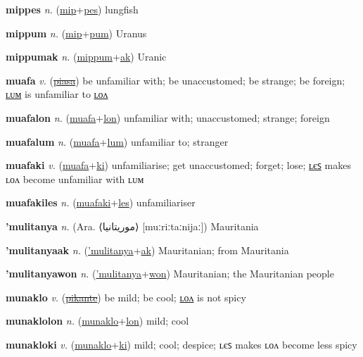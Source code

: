 \textbf{\hypertarget{mippes}{mippes}} \textit{n.} (\hyperlink{mip}{mip}+\allowbreak \hyperlink{pes}{pes})
lungfish

\textbf{\hypertarget{mippum}{mippum}} \textit{n.} (\hyperlink{mip}{mip}+\allowbreak \hyperlink{pum}{pum})
Uranus

\textbf{\hypertarget{mippumak}{mippumak}} \textit{n.} (\hyperlink{mippum}{mippum}+\allowbreak \hyperlink{ak}{ak})
Uranic

\textbf{\hypertarget{muafa}{muafa}} \textit{v.} (\hyperlink{piasa}{\sout{piasa}})
be unfamiliar with; be unaccustomed; be strange; be foreign; \hyperlink{muafalum}{ʟᴜᴍ} is unfamiliar to \hyperlink{muafalon}{ʟᴏᴧ}

\textbf{\hypertarget{muafalon}{muafalon}} \textit{n.} (\hyperlink{muafa}{muafa}+\allowbreak \hyperlink{lon}{lon})
unfamiliar with; unaccustomed; strange; foreign

\textbf{\hypertarget{muafalum}{muafalum}} \textit{n.} (\hyperlink{muafa}{muafa}+\allowbreak \hyperlink{lum}{lum})
unfamiliar to; stranger

\textbf{\hypertarget{muafaki}{muafaki}} \textit{v.} (\hyperlink{muafa}{muafa}+\allowbreak \hyperlink{ki}{ki})
unfamiliarise; get unaccustomed; forget; lose; \hyperlink{muafakiles}{ʟєꜱ} makes ʟᴏᴧ become unfamiliar with ʟᴜᴍ

\textbf{\hypertarget{muafakiles}{muafakiles}} \textit{n.} (\hyperlink{muafaki}{muafaki}+\allowbreak \hyperlink{les}{les})
unfamiliariser

\textbf{\hypertarget{'mulitanya}{'mulitanya}} \textit{n.} (Ara. ⟨{\arabics{}موريتانيا‎}⟩ [muːriːtaːnijaː])
Mauritania

\textbf{\hypertarget{'mulitanyaak}{'mulitanyaak}} \textit{n.} (\hyperlink{'mulitanya}{'mulitanya}+\allowbreak \hyperlink{ak}{ak})
Mauritanian; from Mauritania

\textbf{\hypertarget{'mulitanyawon}{'mulitanyawon}} \textit{n.} (\hyperlink{'mulitanya}{'mulitanya}+\allowbreak \hyperlink{won}{won})
Mauritanian; the Mauritanian people

\textbf{\hypertarget{munaklo}{munaklo}} \textit{v.} (\hyperlink{pikante}{\sout{pikante}})
be mild; be cool; \hyperlink{munaklolon}{ʟᴏᴧ} is not spicy

\textbf{\hypertarget{munaklolon}{munaklolon}} \textit{n.} (\hyperlink{munaklo}{munaklo}+\allowbreak \hyperlink{lon}{lon})
mild; cool

\textbf{\hypertarget{munakloki}{munakloki}} \textit{v.} (\hyperlink{munaklo}{munaklo}+\allowbreak \hyperlink{ki}{ki})
mild; cool; despice; ʟєꜱ makes ʟᴏᴧ become less spicy

